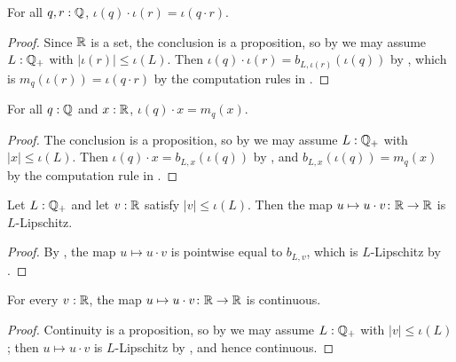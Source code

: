 \begin{lemma}
  \label{ratMulRat}
  For all $q, r : \mathbb{Q}$, $\iota(q) \cdot \iota(r) = \iota(q \cdot r)$.
\end{lemma}
\begin{proof}
  Since $\mathbb{R}$ is a set, the conclusion is a proposition, so by  we may assume $L : \mathbb{Q}_{+}$ with $\lvert \iota(r) \rvert \le \iota(L)$. Then $\iota(q) \cdot \iota(r) = b_{L,\iota(r)}(\iota(q))$ by , which is $m_q(\iota(r)) = \iota(q \cdot r)$ by the computation rules in .
\end{proof}

\begin{lemma}
  \label{ratMulEqScale}
  For all $q : \mathbb{Q}$ and $x : \mathbb{R}$, $\iota(q) \cdot x = m_q(x)$.
\end{lemma}
\begin{proof}
  The conclusion is a proposition, so by  we may assume $L : \mathbb{Q}_{+}$ with $\lvert x \rvert \le \iota(L)$. Then $\iota(q) \cdot x = b_{L,x}(\iota(q))$ by , and $b_{L,x}(\iota(q)) = m_q(x)$ by the computation rule in .
\end{proof}

\begin{lemma}
  \label{mulIsLipschitzWithR}
  Let $L : \mathbb{Q}_{+}$ and let $v : \mathbb{R}$ satisfy $\lvert v \rvert \le \iota(L)$. Then the map $u \mapsto u \cdot v \colon \mathbb{R} \to \mathbb{R}$ is $L$-Lipschitz.
\end{lemma}
\begin{proof}
  By , the map $u \mapsto u \cdot v$ is pointwise equal to $b_{L,v}$, which is $L$-Lipschitz by .
\end{proof}

\begin{corollary}
  \label{mulCR}
  For every $v : \mathbb{R}$, the map $u \mapsto u \cdot v \colon \mathbb{R} \to \mathbb{R}$ is continuous.
\end{corollary}
\begin{proof}
  Continuity is a proposition, so by  we may assume $L : \mathbb{Q}_{+}$ with $\lvert v \rvert \le \iota(L)$; then $u \mapsto u \cdot v$ is $L$-Lipschitz by , and hence continuous.
\end{proof}

